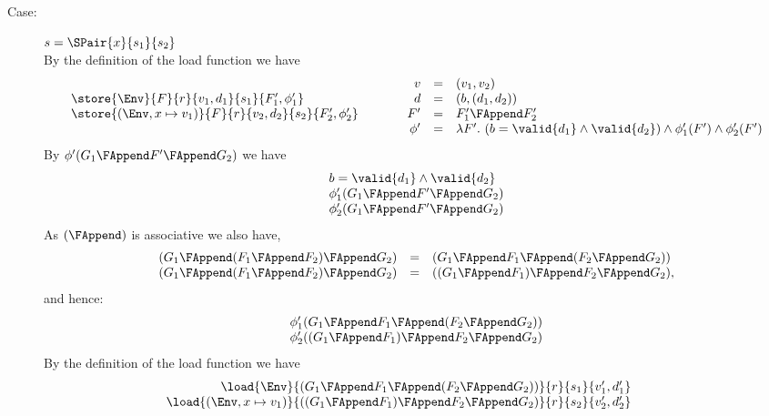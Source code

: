 {\begin{description}
\item[Case:] $s = \SPair{x}{s_1}{s_2}$\\[1ex]
%
By the definition of the load function we have
\[
\begin{array}{l}
\store{\Env}{F}{r}{v_1,d_1}{s_1}{F_1',\phi_1'}\\
\store{(\Env, x \mapsto v_1)}{F}{r}{v_2,d_2}{s_2}{F_2',\phi_2'}\\
\end{array}\hspace*{1cm}\begin{array}{rcl}
v &=& (v_1,v_2)\\
d &=& (b,(d_1,d_2))\\
F' &=& F_1' \FAppend F_2'\\
\phi' &=& \lambda F'.~(b = \valid{d_1} \wedge \valid{d_2}) \wedge \phi_1'(F') \wedge \phi_2'(F')\\
\end{array}
\]
By $\phi'(G_1 \FAppend F' \FAppend G_2)$ we have
\[
\begin{array}{l}
b = \valid{d_1} \wedge \valid{d_2}\\
\phi_1'(G_1 \FAppend F' \FAppend G_2)\\
\phi_2'(G_1 \FAppend F' \FAppend G_2)\\
\end{array}
\]
%
As $(\FAppend)$ is associative we also have,
\[
\begin{array}{rcl}
(G_1\FAppend (F_1\FAppend F_2)\FAppend G_2) &=& (G_1\FAppend F_1\FAppend (F_2\FAppend G_2))\\
(G_1\FAppend (F_1\FAppend F_2)\FAppend G_2) &=& ((G_1\FAppend F_1)\FAppend F_2\FAppend G_2),\\
\end{array}
\]
and hence:
\[
\begin{array}{l}
\phi_1'(G_1\FAppend F_1\FAppend (F_2\FAppend G_2))\\
\phi_2'((G_1\FAppend F_1)\FAppend F_2\FAppend G_2)\\
\end{array}
\]
By the definition of the load function we have 
\[ 
\begin{array}{rcll}
\load{\Env}{(G_1 \FAppend F_1 \FAppend (F_2 \FAppend G_2))}{r}{s_1}{v_1',d_1'}\\
\load{(\Env, x \mapsto v_1)}{((G_1 \FAppend F_1) \FAppend F_2 \FAppend G_2)}{r}{s_2}{v_2',d_2'}\\
\end{array}\hspace*{1cm}\begin{array}{rcl}

\end{array}\]
\end{description}}
